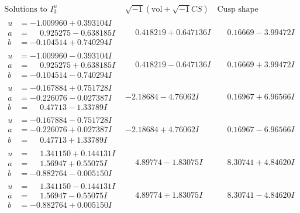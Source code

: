 \documentclass[1p]{elsarticle_modified}
\theoremstyle{definition}
\newcommand{\I}{\sqrt{-1}}
\begin{document}
$$\begin{array}{c|c|c}  
\text{Solutions to }I^u_{3}& \I (\text{vol} + \sqrt{-1}CS) & \text{Cusp shape}\\
 \hline 
\begin{aligned}
u &= -1.009960 + 0.393104 I \\
a &= \phantom{-}0.925275 - 0.638185 I \\
b &= -0.104514 + 0.740294 I\end{aligned}
 & \phantom{-}0.418219 + 0.647136 I & \phantom{-}0.16669 - 3.99472 I \\ \hline\begin{aligned}
u &= -1.009960 - 0.393104 I \\
a &= \phantom{-}0.925275 + 0.638185 I \\
b &= -0.104514 - 0.740294 I\end{aligned}
 & \phantom{-}0.418219 - 0.647136 I & \phantom{-}0.16669 + 3.99472 I \\ \hline\begin{aligned}
u &= -0.167884 + 0.751728 I \\
a &= -0.226076 - 0.027387 I \\
b &= \phantom{-}0.47713 - 1.33789 I\end{aligned}
 & -2.18684 - 4.76062 I & \phantom{-}0.16967 + 6.96566 I \\ \hline\begin{aligned}
u &= -0.167884 - 0.751728 I \\
a &= -0.226076 + 0.027387 I \\
b &= \phantom{-}0.47713 + 1.33789 I\end{aligned}
 & -2.18684 + 4.76062 I & \phantom{-}0.16967 - 6.96566 I \\ \hline\begin{aligned}
u &= \phantom{-}1.341150 + 0.144131 I \\
a &= \phantom{-}1.56947 + 0.55075 I \\
b &= -0.882764 - 0.005150 I\end{aligned}
 & \phantom{-}4.89774 - 1.83075 I & \phantom{-}8.30741 + 4.84620 I \\ \hline\begin{aligned}
u &= \phantom{-}1.341150 - 0.144131 I \\
a &= \phantom{-}1.56947 - 0.55075 I \\
b &= -0.882764 + 0.005150 I\end{aligned}
 & \phantom{-}4.89774 + 1.83075 I & \phantom{-}8.30741 - 4.84620 I \\ \hline\begin{aligned}

\end{aligned}
\end{array}$$
\end{document}
